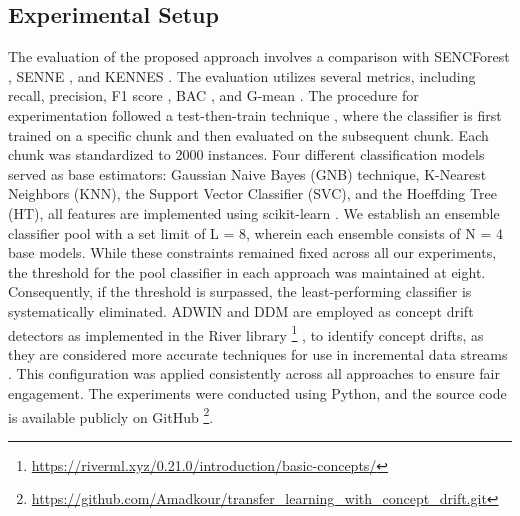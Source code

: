 \subsection{Experimental Setup}
\label{sec:setup}
The evaluation of the proposed approach involves a comparison with SENCForest \cite{mu2017classification}, SENNE \cite{yang2021concept}, and KENNES \cite{zhang2022knnens}. The evaluation utilizes several metrics, including recall, precision, F1 score \cite{sasaki2007truth}, BAC \cite{brodersen2010balanced}, and G-mean \cite{kubat1997addressing}. The procedure for experimentation followed a test-then-train technique \cite{krawczyk2017ensemble}, where the classifier is first trained on a specific chunk and then evaluated on the subsequent chunk. Each chunk was standardized to 2000 instances. Four different classification models served as base estimators: Gaussian Naive Bayes (GNB) technique, K-Nearest Neighbors (KNN), the Support Vector Classifier (SVC), and the Hoeffding Tree (HT), all features are implemented using scikit-learn \cite{ksieniewicz2022stream}. We establish an ensemble classifier pool with a set limit of L = 8, wherein each ensemble consists of N = 4 base models. While these constraints remained fixed across all our experiments, the threshold for the pool classifier in each approach was maintained at eight. Consequently, if the threshold is surpassed, the least-performing classifier is systematically eliminated. ADWIN \cite{adams2023explainable} and DDM \cite{gama2004learning} are employed as concept drift detectors as implemented in the River library \footnote{\url{https://riverml.xyz/0.21.0/introduction/basic-concepts/}} , to identify concept drifts, as they are considered more accurate techniques for use in incremental data streams \cite{gama2004learning}\cite{adams2023explainable}\cite{madkour2023historical}\cite{baena2006early}. This configuration was applied consistently across all approaches to ensure fair engagement. The experiments were conducted using Python, and the source code is available publicly on GitHub \footnote{\url{https://github.com/Amadkour/transfer_learning_with_concept_drift.git}}.
